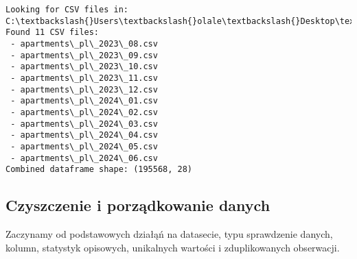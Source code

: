 \documentclass[11pt]{article}
\begin{document}
    \begin{Verbatim}[commandchars=\\\{\}]
Looking for CSV files in: C:\textbackslash{}Users\textbackslash{}olale\textbackslash{}Desktop\textbackslash{}PG\textbackslash{}ML\textbackslash{}ML\_Project\textbackslash{}data
Found 11 CSV files:
 - apartments\_pl\_2023\_08.csv
 - apartments\_pl\_2023\_09.csv
 - apartments\_pl\_2023\_10.csv
 - apartments\_pl\_2023\_11.csv
 - apartments\_pl\_2023\_12.csv
 - apartments\_pl\_2024\_01.csv
 - apartments\_pl\_2024\_02.csv
 - apartments\_pl\_2024\_03.csv
 - apartments\_pl\_2024\_04.csv
 - apartments\_pl\_2024\_05.csv
 - apartments\_pl\_2024\_06.csv
Combined dataframe shape: (195568, 28)
    \end{Verbatim}

    \subsection{Czyszczenie i porządkowanie
danych}\label{czyszczenie-i-porzux105dkowanie-danych}

Zaczynamy od podstawowych działąń na datasecie, typu sprawdzenie danych,
kolumn, statystyk opisowych, unikalnych wartości i zduplikowanych
obserwacji.
\end{document}
